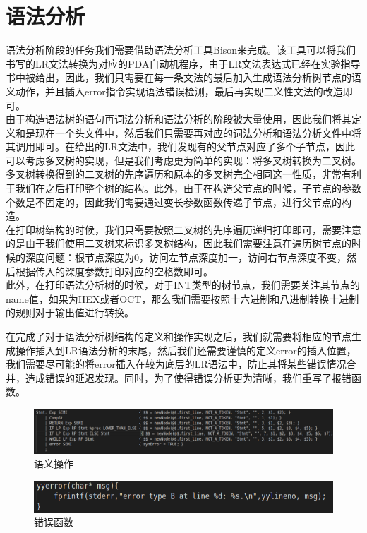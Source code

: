 \documentclass[lang=cn,11pt,a4paper,cite=authoryear]{elegantpaper}
\begin{document}
\section{语法分析}
语法分析阶段的任务我们需要借助语法分析工具Bison来完成。该工具可以将我们书写的LR文法转换为对应的PDA自动机程序，由于LR文法表达式已经在实验指导书中被给出，因此，我们只需要在每一条文法的最后加入生成语法分析树节点的语义动作，并且插入error指令实现语法错误检测，最后再实现二义性文法的改造即可。
\\ \hspace*{0.7cm} 由于构造语法树的语句再词法分析和语法分析的阶段被大量使用，因此我们将其定义和是现在一个头文件中，然后我们只需要再对应的词法分析和语法分析文件中将其调用即可。在给出的LR文法中，我们发现有的父节点对应了多个子节点，因此可以考虑多叉树的实现，但是我们考虑更为简单的实现：将多叉树转换为二叉树。多叉树转换得到的二叉树的先序遍历和原本的多叉树完全相同这一性质，非常有利于我们在之后打印整个树的结构。此外，由于在构造父节点的时候，子节点的参数个数是不固定的，因此我们需要通过变长参数函数传递子节点，进行父节点的构造。
\\ \hspace*{0.7cm}在打印树结构的时候，我们只需要按照二叉树的先序遍历递归打印即可，需要注意的是由于我们使用二叉树来标识多叉树结构，因此我们需要注意在遍历树节点的时候的深度问题：根节点深度为0，访问左节点深度加一，访问右节点深度不变，然后根据传入的深度参数打印对应的空格数即可。
\\ \hspace*{0.7cm}此外，在打印语法分析树的时候，对于INT类型的树节点，我们需要关注其节点的name值，如果为HEX或者OCT，那么我们需要按照十六进制和八进制转换十进制的规则对于输出值进行转换。


在完成了对于语法分析树结构的定义和操作实现之后，我们就需要将相应的节点生成操作插入到LR语法分析的末尾，然后我们还需要谨慎的定义error的插入位置，我们需要尽可能的将error插入在较为底层的LR语法中，防止其将某些错误情况合并，造成错误的延迟发现。同时，为了使得错误分析更为清晰，我们重写了报错函数。
\begin{figure}[h]
	\centering
	\includegraphics[width=\textwidth]{pics//2_2.png}
	\caption{语义操作}
\end{figure}
\begin{figure}[h]
	\centering
	\includegraphics[width=\textwidth]{pics//2_3.png}
	\caption{错误函数}
\end{figure}
\end{document}
